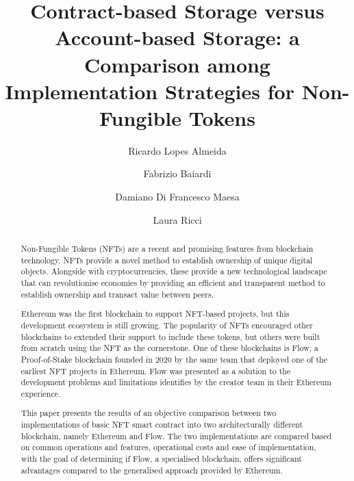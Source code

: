 \documentclass[10pt]{article}
\author[1]{Ricardo Lopes Almeida}
\author[2]{Fabrizio Baiardi}
\author[3]{Damiano Di Francesco Maesa}
\author[4]{Laura Ricci}
\affil[1, 2, 3, 4]{Dipartimento di Informatica, Università di Pisa, Italia}
\affil[1]{Università di Camerino, Italia}
\title{Contract-based Storage versus Account-based Storage: a Comparison among Implementation Strategies for Non-Fungible Tokens }
\begin{document}
\maketitle

\begin{abstract}
    Non-Fungible Tokens (NFTs) are a recent and promising features from blockchain technology. NFTs provide a novel method to establish ownership of unique digital objects. Alongside with cryptocurrencies, these provide a new technological landscape that can revolutionise economies by providing an efficient and transparent method to establish ownership and transact value between peers.
    \par
    Ethereum was the first blockchain to support NFT-based projects, but this development ecosystem is still growing. The popularity of NFTs encouraged other blockchains to extended their support to include these tokens, but others were built from scratch using the NFT as the cornerstone. One of these blockchains is Flow, a Proof-of-Stake blockchain founded in 2020 by the same team that deployed one of the earliest NFT projects in Ethereum. Flow was presented as a solution to the development problems and limitations identifies by the creator team in their Ethereum experience.
    \par
    This paper presents the results of an objective comparison between two implementations of basic NFT smart contract into two architecturally different blockchain, namely Ethereum and Flow. The two implementations are compared based on common operations and features, operational costs and ease of implementation, with the goal of determining if Flow, a specialised blockchain, offers significant advantages compared to the generalised approach provided by Ethereum.
\end{abstract}



















\printbibliography
\end{document}
